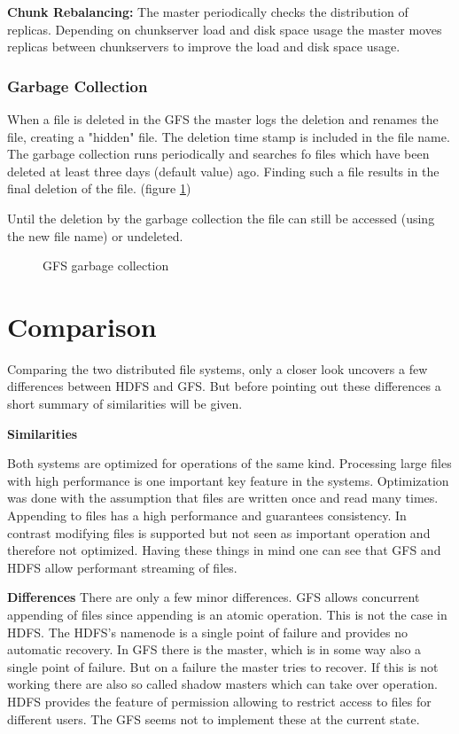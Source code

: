 \documentclass{sig-alternate}
\begin{document}
\textbf{Chunk Rebalancing:}
The master periodically checks the distribution of replicas. Depending on chunkserver load and disk space usage the master moves replicas between chunkservers to improve the load and disk space usage.

\subsubsection{Garbage Collection}
\label{gfs_gc}
When a file is deleted in the GFS the master logs the deletion and renames the file, creating a "hidden" file. The deletion time stamp is included in the file name. The garbage collection runs periodically and searches fo files which have been deleted at least three days (default value) ago. Finding such a file results in the final deletion of the file. (figure \ref{fig:gfs_gc})

Until the deletion by the garbage collection the file can still be accessed (using the new file name) or undeleted.

\begin{figure}[!hbt]
\centering
{}
\caption{GFS garbage collection}
\label{fig:gfs_gc}
\end{figure}

\section{Comparison}
Comparing the two distributed file systems, only a closer look uncovers a few differences between HDFS and GFS. But before pointing out these differences a short summary of similarities will be given.\cite{comparison1}

\textbf{Similarities}

Both systems are optimized for operations of the same kind. Processing large files with high performance is one important key feature in the systems. Optimization was done with the assumption that files are written once and read many times. Appending to files has a high performance and guarantees consistency. In contrast modifying files is supported but not seen as important operation and therefore not optimized.
Having these things in mind one can see that GFS and HDFS allow performant streaming of files.

\textbf{Differences}
There are only a few minor differences. GFS allows concurrent appending of files since appending is an atomic operation. This is not the case in HDFS.
The HDFS's namenode is a single point of failure and provides no automatic recovery. In GFS there is the master, which is in some way also a single point of failure. But on a failure the master tries to recover. If this is not working there are also so called shadow masters which can take over operation.
HDFS provides the feature of permission allowing to restrict access to files for different users. The GFS seems not to implement these at the current state.
\end{document}

